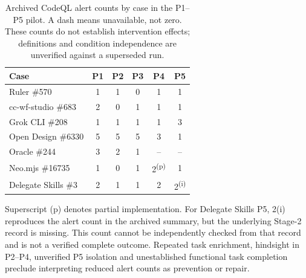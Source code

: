 \begin{table}[H]
\caption{Archived CodeQL alert counts by case in the P1--P5 pilot. A dash means unavailable, not zero. These counts do not establish intervention effects; definitions and condition independence are unverified against a superseded run.}
\label{tab:p1p5}
\small
\begin{tabular}{@{}lccccc@{}}
\toprule
\textbf{Case} & \textbf{P1} & \textbf{P2} & \textbf{P3} & \textbf{P4} & \textbf{P5}\\
\midrule
Ruler \#570 & 1&1&0&1&1\\
cc-wf-studio \#683 & 2&0&1&1&1\\
Grok CLI \#208 & 1&1&1&1&3\\
Open Design \#6330 & 5&5&5&3&1\\
Oracle \#244 & 3&2&1&--&--\\
Neo.mjs \#16735 & 1&0&1&2\textsuperscript{(p)}&1\\
Delegate Skills \#3 & 2&1&1&2&2\textsuperscript{(i)}\\
\bottomrule
\end{tabular}
\par\smallskip\raggedright\footnotesize Superscript (p) denotes partial implementation. For Delegate Skills P5, 2(i) reproduces the alert count in the archived summary, but the underlying Stage-2 record is missing. This count cannot be independently checked from that record and is not a verified complete outcome. Repeated task enrichment, hindsight in P2--P4, unverified P5 isolation and unestablished functional task completion preclude interpreting reduced alert counts as prevention or repair.
\end{table}

{}

